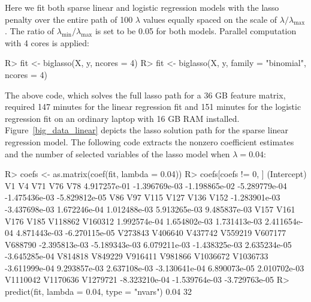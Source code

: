 Here we fit both sparse linear and logistic regression models with the lasso penalty over the entire path of 100 $\lambda$ values equally spaced on the scale of $\lambda / \lambda_{\max}$. The ratio of $\lambda_{\min} / \lambda_{\max}$ is set to be 0.05 for both models. Parallel computation with 4 cores is applied:

\begin{example}
R> fit <- biglasso(X, y, ncores = 4)
R> fit <- biglasso(X, y, family = "binomial", ncores = 4)
\end{example}

The above code, which solves the full lasso path for a 36 GB feature matrix, required 147 minutes for the linear regression fit and 151 minutes for the logistic regression fit on an ordinary laptop with 16 GB RAM installed.  Figure~\ref{big_data_linear} depicts the lasso solution path for the sparse linear regression model. The following code extracts the nonzero coefficient estimates and the number of selected variables of the lasso model when $\lambda = 0.04$:

\begin{example}
R> coefs <- as.matrix(coef(fit, lambda = 0.04))
R> coefs[coefs != 0, ]
  (Intercept)            V1            V4           V71           V76           V78 
 4.917257e-01 -1.396769e-03 -1.198865e-02 -5.289779e-04 -1.475436e-03 -5.829812e-05 
          V86           V97          V115          V127          V136          V152 
-1.283901e-03 -3.437698e-03  1.672246e-04  1.012488e-03  5.913265e-03  9.485837e-03 
         V157          V161          V176          V185       V118862       V160312 
 1.992574e-04  1.654802e-03  1.731413e-03  2.411654e-04  4.871443e-03 -6.270115e-05 
      V273843       V406640       V437742       V559219       V607177       V688790 
-2.395813e-03 -5.189343e-03  6.079211e-03 -1.438325e-03  2.635234e-05 -3.645285e-04 
      V814818       V849229       V916411       V981866      V1036672      V1036733 
-3.611999e-04  9.293857e-03  2.637108e-03 -3.130641e-04  6.890073e-05  2.010702e-03 
     V1110042      V1170636      V1279721 
-8.323210e-04 -1.539764e-03 -3.729763e-05 
R> predict(fit, lambda = 0.04, type = "nvars")
0.04 
  32 
\end{example}

